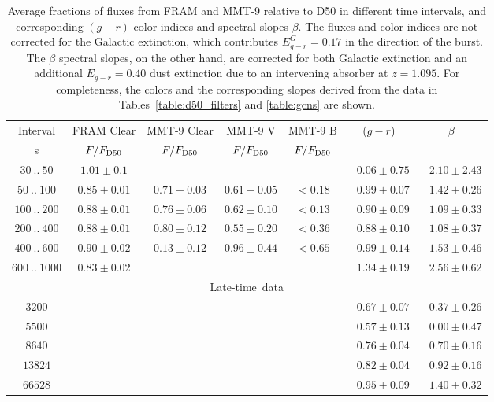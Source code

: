 \documentclass{naturesubmissionstyle}
\begin{document}

\begin{table}
\centering
\begin{tabular}{cccccrr}
\multicolumn{1}{c}{Interval} & FRAM Clear & MMT-9 Clear & MMT-9 V & MMT-9 B & \multicolumn{1}{c}{($g-r$)} & \multicolumn{1}{c}{$\beta$}\\
\multicolumn{1}{c}{s} & $F/F_{\rm D50}$ & $F/F_{\rm D50}$  & $F/F_{\rm D50}$  & $F/F_{\rm D50}$ &  \\
\hline
$30\ ..\ 50$ & $1.01\pm0.1$ & & & & $-0.06\pm0.75$ & $-2.10\pm2.43$\\
$50\ ..\ 100$ & $0.85\pm0.01$ & $0.71\pm0.03$ & $0.61\pm0.05$ & $<0.18$ & $0.99\pm0.07$ & $1.42\pm0.26$\\
$100\ ..\ 200$ & $0.88\pm0.01$ & $0.76\pm0.06$ & $0.62\pm0.10$ & $<0.13$ & $0.90\pm0.09$ & $1.09\pm0.33$\\
$200\ ..\ 400$ & $0.88\pm0.01$ & $0.80\pm0.12$ & $0.55\pm0.20$ & $<0.36$ & $0.88\pm0.10$ & $1.08\pm0.37$\\
$400\ ..\ 600$ & $0.90\pm0.02$ & $0.13\pm0.12$ & $0.96\pm0.44$ & $<0.65$ & $0.99\pm0.14$ & $1.53\pm0.46$\\
$600\ ..\ 1000$ & $0.83\pm0.02$ & & & & $1.34\pm0.19$ & $2.56\pm0.62$\\
\hline	
\multicolumn{7}{c}{\mbox{Late-time data}} \\
$3200$ & & & & &$0.67\pm0.07$ & $0.37\pm0.26$ \\
$5500$ & & & & &$0.57\pm0.13$ & $0.00\pm0.47$ \\
$8640$ & & & & &$0.76\pm0.04$ & $0.70\pm0.16$ \\
$13824$ & & & & &$0.82\pm0.04$ & $0.92\pm0.16$ \\
$66528$ & & & & &$0.95\pm0.09$ & $1.40\pm0.32$ \\

\hline

\end{tabular}
\caption{Average fractions of fluxes from FRAM and MMT-9 relative to D50 in different time intervals, and corresponding $(g-r)$ color indices and spectral slopes $\beta$. The fluxes and color indices are not corrected for the Galactic extinction, which contributes $E_{g-r}^G=0.17$ in the direction of the burst. The $\beta$ spectral slopes, on the other hand, are corrected for both Galactic extinction and an additional $E_{g-r}=0.40$ dust extinction due to an intervening absorber at $z=1.095$. %
For completeness, the colors and the corresponding slopes derived from the data in Tables~\ref{table:d50_filters} and \ref{table:gcns} are shown.}
\label{table:colors}
\end{table}
\end{document}
